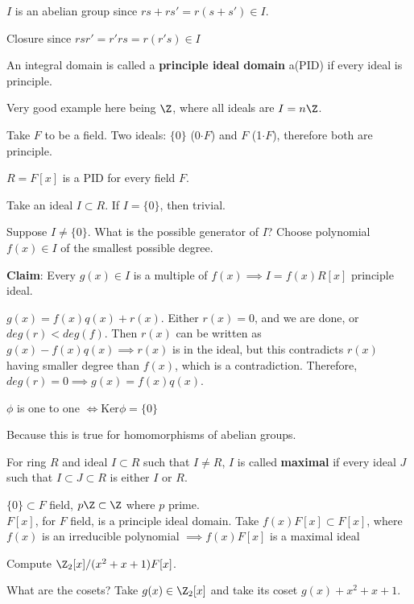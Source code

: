 \documentclass[twoside, 10pt]{article}
\newcommand{\Ker}{\text{Ker}}
\begin{document}
$I$ is an abelian group since $rs + rs' = r(s + s') \in I$.

Closure since $rsr' = r'rs = r(r's) \in I$

\begin{defn}
    An integral domain is called a \textbf{principle ideal domain} a(PID) if every ideal is principle.
\end{defn}
Very good example here being $\Z$, where all ideals are $I = n\Z$.

Take $F$ to be a field. Two ideals: $\{0\}$ (0$\cdot F$) and $F$ (1$\cdot F$), therefore both are principle.

\begin{thm}
    $R = F[x]$ is a PID for every field $F$.
\end{thm}
Take an ideal $I \subset R$. If $I = \{0\}$, then trivial. 

Suppose $I\neq \{0\}$. What is the possible generator of $I$? Choose polynomial $f(x) \in I$ of the smallest possible degree.

\textbf{Claim}: Every $g(x) \in I$ is a multiple of $f(x) \implies I = f(x)R[x]$ principle ideal.

$g(x) = f(x)q(x) + r(x)$. Either $r(x) = 0$, and we are done, or $deg(r) < deg(f)$. Then $r(x)$ can be written as $g(x) - f(x)q(x) \implies r(x)$ is in the ideal, but this contradicts $r(x)$ having smaller degree than $f(x)$, which is a contradiction. Therefore, $deg(r) = 0 \implies g(x) = f(x)q(x)$.

\begin{rmk}
    $\phi$ is one to one $\iff \Ker\phi = \{0\}$
\end{rmk}
Because this is true for homomorphisms of abelian groups.

\begin{defn}
    For ring $R$ and ideal $I \subset R$ such that $I \neq R$, $I$ is called \textbf{maximal} if every ideal $J$ such that $I \subset J \subset R$ is either $I$ or $R$.
\end{defn}

\begin{exm*}
    $\{0\} \subset F$ field, $p\Z \subset \Z$ where $p$ prime.\\
    $F[x]$, for $F$ field, is a principle ideal domain. Take $f(x)F[x] \subset F[x]$, where $f(x)$ is an irreducible polynomial $\implies f(x)F[x]$ is a maximal ideal
\end{exm*}

\begin{exm}
    Compute $\Z_2[x]/(x^2 + x + 1)F[x]$. 
\end{exm}
What are the cosets? Take $g(x) \in \Z_2[x]$ and take its coset $g(x) + x^2 + x + 1$.
\end{document}
